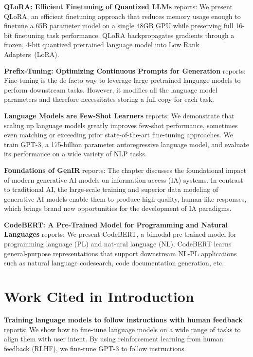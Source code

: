 \documentclass[10pt,twocolumn,letterpaper]{article}
\begin{document}
\textbf{QLoRA: Efficient Finetuning of Quantized LLMs} \cite{crossref_10_48550_arxiv_2305_14314} reports: We present QLoRA, an efficient finetuning approach that reduces memory usage enough to finetune a 65B parameter model on a single 48GB GPU while preserving full 16-bit finetuning task performance. QLoRA backpropagates gradients through a frozen, 4-bit quantized pretrained language model into Low Rank Adapters~(LoRA).

\textbf{Prefix-Tuning: Optimizing Continuous Prompts for Generation} \cite{arxiv_2101_00190} reports: Fine-tuning is the de facto way to leverage large pretrained language models to perform downstream tasks. However, it modifies all the language model parameters and therefore necessitates storing a full copy for each task.

\textbf{Language Models are Few-Shot Learners} \cite{arxiv_2005_14165} reports: We demonstrate that scaling up language models greatly improves few-shot performance, sometimes even matching or exceeding prior state-of-the-art fine-tuning approaches. We train GPT-3, a 175-billion parameter autoregressive language model, and evaluate its performance on a wide variety of NLP tasks.

\textbf{Foundations of GenIR} \cite{arxiv_2501_02842} reports: The chapter discusses the foundational impact of modern generative AI models on information access (IA) systems. In contrast to traditional AI, the large-scale training and superior data modeling of generative AI models enable them to produce high-quality, human-like responses, which brings brand new opportunities for the development of IA paradigms.

\textbf{CodeBERT: A Pre-Trained Model for Programming and Natural Languages} \cite{arxiv_2002_08155} reports: We present CodeBERT, a bimodal pre-trained model for programming language (PL) and nat-ural language (NL). CodeBERT learns general-purpose representations that support downstream NL-PL applications such as natural language codesearch, code documentation generation, etc.


\section{Work Cited in Introduction}


\textbf{Training language models to follow instructions with human feedback} \cite{arxiv_2203_02155} reports: We show how to fine-tune language models on a wide range of tasks to align them with user intent. By using reinforcement learning from human feedback (RLHF), we fine-tune GPT-3 to follow instructions.
\end{document}
